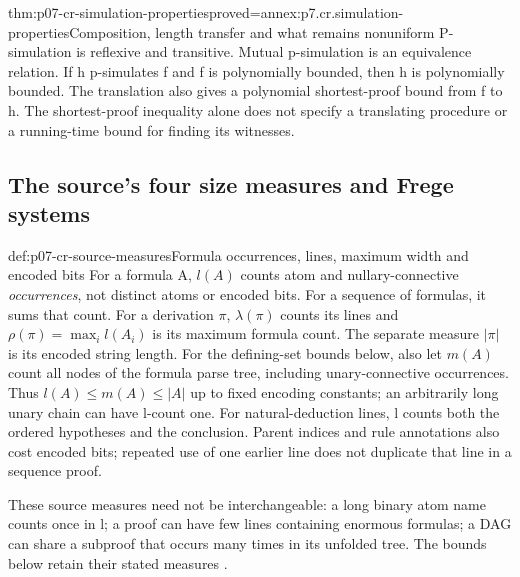 \begin{hbtheorem}{thm:p07-cr-simulation-properties}{proved=annex:p7.cr.simulation-properties}{Composition, length transfer and what remains nonuniform}
P-simulation is reflexive and transitive. Mutual p-simulation is an
equivalence relation. If h p-simulates f and f is polynomially bounded,
then h is polynomially bounded. The translation also gives a polynomial
shortest-proof bound from f to h. The shortest-proof inequality alone
does not specify a translating procedure or a running-time bound for
finding its witnesses.
\end{hbtheorem}

\subsection{The source's four size measures and Frege systems}

\begin{hbdefinition}{def:p07-cr-source-measures}{Formula occurrences, lines, maximum width and encoded bits}
For a formula A, \(l(A)\) counts atom and nullary-connective
\emph{occurrences}, not distinct atoms or encoded bits. For a sequence
of formulas, it sums that count. For a derivation \(\pi\),
\(\lambda(\pi)\) counts its lines and
\(\rho(\pi)=\max_i l(A_i)\) is its maximum formula count.
The separate measure \(|\pi|\) is its encoded string length.
For the defining-set bounds below, also let \(m(A)\) count all
nodes of the formula parse tree, including unary-connective occurrences.
Thus \(l(A)\leq m(A)\leq |A|\) up to fixed encoding constants;
an arbitrarily long unary chain can have l-count one.
For natural-deduction lines, l counts both the ordered hypotheses
and the conclusion. Parent indices and rule annotations also cost
encoded bits; repeated use of one earlier line does not duplicate
that line in a sequence proof.

These source measures need not be interchangeable: a long binary
atom name counts once in l; a proof can have few lines containing
enormous formulas; a DAG can share a subproof that occurs many times
in its unfolded tree. The bounds below retain their stated measures
\cite[p.~39]{CookReckhow1979}.
\end{hbdefinition}

